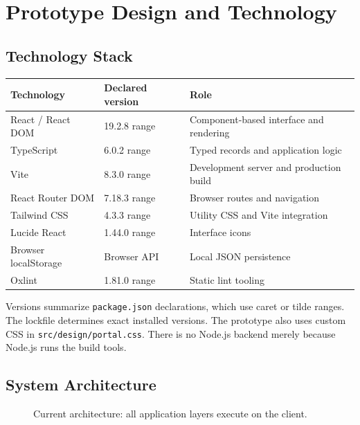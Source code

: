 \documentclass[11pt,a4paper]{report}
\newcommand{\src}[1]{\nolinkurl{#1}}
\begin{document}
\chapter{Prototype Design and Technology}
\section{Technology Stack}
\begin{tabularx}{\textwidth}{@{}p{35mm}p{27mm}Y@{}}\toprule Technology & Declared version & Role\\\midrule React / React DOM & 19.2.8 range & Component-based interface and rendering\\TypeScript & 6.0.2 range & Typed records and application logic\\Vite & 8.3.0 range & Development server and production build\\React Router DOM & 7.18.3 range & Browser routes and navigation\\Tailwind CSS & 4.3.3 range & Utility CSS and Vite integration\\Lucide React & 1.44.0 range & Interface icons\\Browser localStorage & Browser API & Local JSON persistence\\Oxlint & 1.81.0 range & Static lint tooling\\\bottomrule\end{tabularx}
Versions summarize \src{package.json} declarations, which use caret or tilde ranges. The lockfile determines exact installed versions. The prototype also uses custom CSS in \src{src/design/portal.css}. There is no Node.js backend merely because Node.js runs the build tools.
\section{System Architecture}
\begin{figure}[H]\centering
{}\caption{Current architecture: all application layers execute on the client.}
\end{figure}
\clearpage
\end{document}
